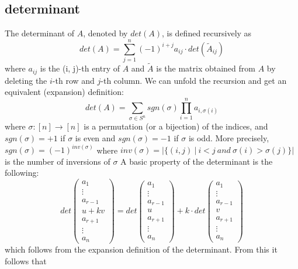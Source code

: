 \documentclass[11pt,a4paper]{report}
\begin{document}
\subsection{determinant}
The determinant of $A$, denoted by $det(A)$, is defined recursively as $$det(A)=\sum_{j=1}^{n}(-1)^{i+j}a_{ij}\cdot  det(\tilde{A}_{ij})$$
\indent where $a_{ij}$ is the (i, j)-th entry of $A$ and $\tilde{A}$ is the matrix obtained from $A$ by deleting the $i$-th row and $j$-th column.
\newline We can unfold the recursion and get an equivalent (expansion) definition:
$$ det(A)=\sum_{\sigma\in S^n}^{} sgn(\sigma) \prod_{i=1}^{n}a_{i,\sigma(i)}$$
\indent where $\sigma :[n]\rightarrow [n]$ is a permutation (or a bijection) of the indices, and $sgn(\sigma)=+1$ if $\sigma$ is even and $sgn(\sigma)=-1$ if $\sigma$ is odd. More precisely, $sgn(\sigma)=(-1)^{inv(\sigma)}$ where $ inv(\sigma)=\vert \{(i,j) \ \vert \ i < j \ and \ \sigma (i) > \sigma (j) \} \vert $ is the number of inversions of $\sigma$
\newline\newline A basic property of the determinant is the following:
\[ det\begin{pmatrix}
a_1 \\ \vdots \\ a_{r-1} \\ u+kv \\ a_{r+1} \\ \vdots \\ a_n
\end{pmatrix}
= 
det\begin{pmatrix}
a_1 \\ \vdots \\ a_{r-1} \\ u \\ a_{r+1} \\ \vdots \\ a_n
\end{pmatrix}
+
k\cdot det \begin{pmatrix}
a_1 \\ \vdots \\ a_{r-1} \\ v \\ a_{r+1} \\ \vdots \\ a_n
\end{pmatrix}
\] which follows from the expansion definition of the determinant.
\newline From this it follows that 
\end{document}
